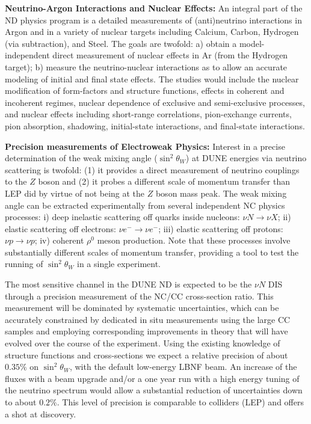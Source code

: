 \vspace{0.25cm} 
\noindent 
{\bf Neutrino-Argon Interactions and Nuclear Effects:} 
An integral part of the ND physics program is a  detailed measurements of (anti)neutrino 
interactions in Argon and in a variety of nuclear targets including Calcium, Carbon, Hydrogen (via subtraction), 
and Steel. 
The goals are twofold: a) obtain a model-independent direct measurement of nuclear effects in Ar (from 
the Hydrogen target); b) measure the neutrino-nuclear interactions as to allow an accurate modeling 
of initial and final state effects. The studies would include 
the nuclear modification of form-factors and structure functions, effects in coherent and incoherent 
regimes, nuclear dependence of exclusive and semi-exclusive processes, and nuclear 
effects including short-range correlations, pion-exchange currents, pion absorption, shadowing, 
initial-state interactions, and final-state interactions. 

\vspace{0.25cm} 
\noindent 
{\bf Precision measurements of  Electroweak Physics:} 
Interest in a precise determination of the weak mixing angle ($\sin^2 \theta_W$) at DUNE 
energies via neutrino scattering is twofold: (1) it provides a direct measurement of neutrino couplings to 
the $Z$ boson and (2) it probes a different scale of momentum transfer than LEP did by virtue
of not being at the $Z$ boson mass peak. 
% 
The weak mixing angle can be extracted experimentally from several independent NC physics processes:
i) deep inelastic scattering off quarks inside nucleons: $\nu N \to \nu X$; ii) elastic scattering off electrons: $\nu e^- \to \nu e^-$; 
iii) elastic scattering off protons: $\nu p \to \nu p$; iv) coherent $\rho^0$ meson production. 
Note that these processes involve
substantially different scales of momentum transfer, providing a tool
to test the running of $\sin^2 \theta_W$ in a single experiment. 

The most sensitive channel in the DUNE ND is expected to be the $\nu N$ DIS through a precision measurement 
of the NC/CC cross-section ratio. This measurement will be dominated by systematic uncertainties, which can be 
accurately constrained by dedicated in situ measurements using the large CC samples and employing corresponding 
improvements in theory that will have evolved over the course of the experiment. Using the existing knowledge of 
structure functions and cross-sections we expect a relative precision of about $0.35\%$ on $\sin^2 \theta_W$, with 
the default low-energy LBNF beam. An increase of the fluxes with a beam upgrade and/or a one year run with a high 
energy tuning of the neutrino spectrum would allow a substantial reduction of uncertainties down to about $0.2\%$. 
This level of precision is comparable to colliders (LEP) and offers a shot at discovery. 

